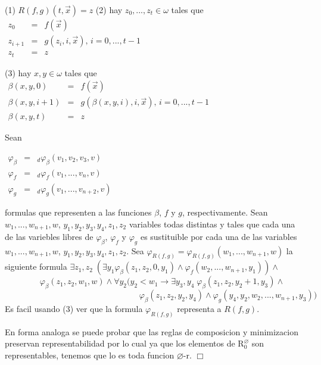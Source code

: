 (1) \(R(f,g)(t,\vec{x})=z\)
(2) hay \(z_{0},...,z_{t}\in \omega \) tales que
\(\displaystyle \begin{array}{rcl} z_{0} & =& f(\vec{x}) \\ z_{i+1} & =& g(z_{i},i,\vec{x})\text{, }i=0,...,t-1 \\ z_{t} & =& z \end{array} \)

(3) hay \(x,y\in \omega \) tales que
\(\displaystyle \begin{array}{rcl} \beta (x,y,0) & =& f(\vec{x}) \\ \beta (x,y,i+1) & =& g(\beta (x,y,i),i,\vec{x})\text{, }i=0,...,t-1 \\ \beta (x,y,t) & =& z \end{array} \)

Sean

\(\displaystyle \begin{array}{rcl} \varphi _{\beta } & =& _{d}\varphi _{\beta }(v_{1},v_{2},v_{3},v) \\ \varphi _{f} & =& _{d}\varphi _{f}(v_{1},...,v_{n},v) \\ \varphi _{g} & =& _{d}\varphi _{g}(v_{1},...,v_{n+2},v) \end{array} \)

formulas que representen a las funciones \(\beta \), \(f\) y \(g\), respectivamente. Sean \(w_{1},...,w_{n+1},w\), \( y_{1},y_{2},y_{3},y_{4},z_{1},z_{2}\) variables todas distintas y tales que cada una de las variebles libres de \(\varphi _{\beta }\), \(\varphi _{f}\) y \( \varphi _{g}\) es sustituible por cada una de las variables \( w_{1},...,w_{n+1},w\), \(y_{1},y_{2},y_{3},y_{4},z_{1},z_{2}\). Sea \(\varphi _{R(f,g)}=\varphi _{R(f,g)}(w_{1},...,w_{n+1},w)\) la siguiente formula
\(\exists z_{1},z_{2}\;(\exists y_{1}\varphi _{\beta }(z_{1},z_{2},0,y_{1})\wedge \varphi _{f}(w_{2},...,w_{n+1},y_{1}))\wedge \)
\(\ \ \ \ \ \ \ \ \ \ \ \ \ \ \ \ \ \ \ \varphi _{\beta }(z_{1},z_{2},w_{1},w)\wedge \forall y_{2}(y_{2}< w_{1}\rightarrow \exists y_{3},y_{4}\;\varphi _{\beta }(z_{1},z_{2},y_{2}+1,y_{3})\wedge \)
\(\ \ \ \ \ \ \ \ \ \ \ \ \ \ \ \ \ \ \ \ \ \ \ \ \ \ \ \ \ \ \ \ \ \ \ \ \ \ \ \ \ \ \ \ \ \ \ \ \ \ \ \ \ \ \ \ \ \ \ \ \ \ \ \ \ \ \ \ \ \ \ \ \ \varphi _{\beta }(z_{1},z_{2},y_{2},y_{4})\wedge \varphi _{g}(y_{4},y_{2},w_{2},...,w_{n+1},y_{3}))\)
Es facil usando (3) ver que la formula \(\varphi _{R(f,g)}\) representa a \(R(f,g)\).

En forma analoga se puede probar que las reglas de composicion y minimizacion preservan representabilidad por lo cual ya que los elementos de \(\mathrm{R}_{0}^{\varnothing }\) son representables, tenemos que lo es toda funcion \(\varnothing \)-r. \(\Box\)


